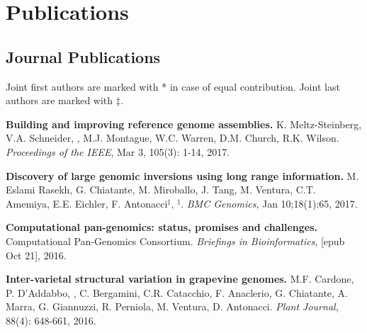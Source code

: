 \section{\sc Publications}
                                       
                                       \vspace{-0.5cm}
                                       
                                       \subsection{\small \sc Journal Publications}
                                       \vspace{-0.6cm}
                                       
                                       \small{
                                         Joint first authors are marked with * in case of equal contribution. Joint last authors are marked with $\ddag$.
                                       }


  \vspace{-.2cm}        
         {\bf Building and improving reference genome assemblies.} K. Meltz-Steinberg, V.A. Schneider, \calkan{}, M.J. Montague, W.C. Warren, D.M. Church, R.K. Wilson.
         {\em Proceedings of the IEEE}, Mar 3, 105(3): 1-14, 2017.



  \vspace{-.2cm}        
         {\bf Discovery of large genomic inversions using long
range information.} M. Eslami Rasekh, G. Chiatante, M. Miroballo, J. Tang, M. Ventura, C.T. Amemiya, E.E. Eichler, F. Antonacci$^\ddag$, \calkan{}$^\ddag$.
         {\em BMC Genomics}, Jan 10;18(1):65, 2017.

         \vspace{-.2cm}        

         {\bf Computational pan-genomics: status, promises and challenges.}
         Computational Pan-Genomics Consortium. {\em Briefings in Bioinformatics}, [epub Oct 21], 2016.
         
  \vspace{-.2cm}        
  {\bf Inter-varietal structural variation in grapevine genomes.}
 M.F. Cardone, P. D'Addabbo, \calkan{}, C. Bergamini, C.R. Catacchio, F. Anaclerio, G. Chiatante, A. Marra, G. Giannuzzi, R. Perniola, M. Ventura, D. Antonacci.
 {\em Plant Journal}, 88(4): 648-661, 2016.

